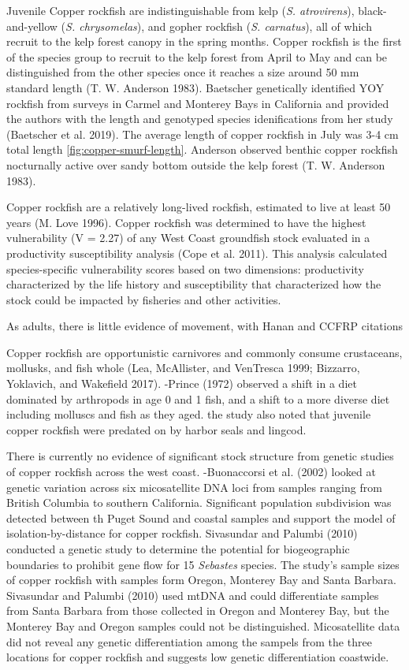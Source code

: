 \documentclass[11pt,
  english,
  letterpaper,
]{article}
\begin{document}
Juvenile Copper rockfish are indistinguishable from kelp (\emph{S. atrovirens}), black-and-yellow (\emph{S. chrysomelas}), and gopher rockfish (\emph{S. carnatus}), all of which recruit to the kelp forest canopy in the spring months. Copper rockfish is the first of the species group to recruit to the kelp forest from April to May and can be distinguished from the other species once it reaches a size around 50 mm standard length (T. W. Anderson 1983). Baetscher genetically identified YOY rockfish from surveys in Carmel and Monterey Bays in California and provided the authors with the length and genotyped species idenifications from her study (Baetscher et al. 2019). The average length of copper rockfish in July was 3-4 cm total length \ref{fig:copper-smurf-length}. Anderson observed benthic copper rockfish nocturnally active over sandy bottom outside the kelp forest (T. W. Anderson 1983).

Copper rockfish are a relatively long-lived rockfish, estimated to live at least 50 years (M. Love 1996). Copper rockfish was determined to have the highest vulnerability (V = 2.27) of any West Coast groundfish stock evaluated in a productivity susceptibility analysis (Cope et al. 2011). This analysis calculated species-specific vulnerability scores based on two dimensions: productivity characterized by the life history and susceptibility that characterized how the stock could be impacted by fisheries and other activities.

As adults, there is little evidence of movement, with Hanan and CCFRP citations

Copper rockfish are opportunistic carnivores and commonly consume crustaceans, mollusks, and fish whole (Lea, McAllister, and VenTresca 1999; Bizzarro, Yoklavich, and Wakefield 2017). -Prince (1972) observed a shift in a diet dominated by arthropods in age 0 and 1 fish, and a shift to a more diverse diet including molluscs and fish as they aged. the study also noted that juvenile copper rockfish were predated on by harbor seals and lingcod.

There is currently no evidence of significant stock structure from genetic studies of copper rockfish across the west coast. -Buonaccorsi et al. (2002) looked at genetic variation across six micosatellite DNA loci from samples ranging from British Columbia to southern California. Significant population subdivision was detected between th Puget Sound and coastal samples and support the model of isolation-by-distance for copper rockfish. Sivasundar and Palumbi (2010) conducted a genetic study to determine the potential for biogeographic boundaries to prohibit gene flow for 15 \emph{Sebastes} species. The study's sample sizes of copper rockfish with samples form Oregon, Monterey Bay and Santa Barbara. Sivasundar and Palumbi (2010) used mtDNA and could differentiate samples from Santa Barbara from those collected in Oregon and Monterey Bay, but the Monterey Bay and Oregon samples could not be distinguished. Micosatellite data did not reveal any genetic differentiation among the sampels from the three locations for copper rockfish and suggests low genetic differentiation coastwide.
\end{document}
